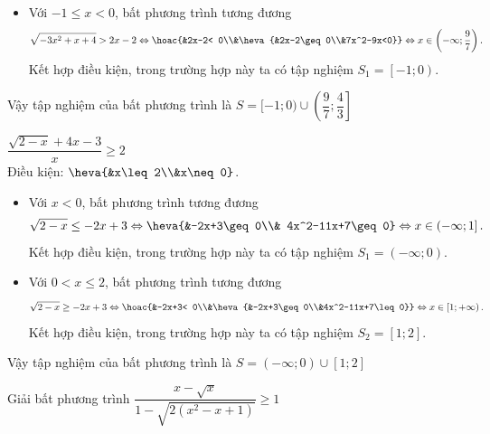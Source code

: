 \begin{bt}
{\begin{listEX}[1]
\begin{itemize}
				\item Với $-1\leq x<0$, bất phương trình tương đương $$\sqrt{-3x^2+x+4}>2x-2\Leftrightarrow \hoac{&2x-2< 0\\&\heva{&2x-2\geq  0\\&7x^2-9x<0}}\Leftrightarrow x\in \left(-\infty;\dfrac{9}{7}\right).$$ 
				Kết hợp điều kiện, trong trường hợp này ta có tập nghiệm $S_1=\left[-1;0\right).$
			\end{itemize}
			Vậy tập nghiệm của bất phương trình là $S=[-1;0)\cup \left(\dfrac{9}{7};\dfrac{4}{3}\right]$
			\item $\dfrac{\sqrt{2-x}+4x-3}x\geq 2$\\
			Điều kiện: $\heva{&x\leq 2\\&x\neq 0}$.
			\begin{itemize}
				\item Với $x<0$, bất phương trình tương đương $$\sqrt{2-x}\leq -2x+3\Leftrightarrow \heva{&-2x+3\geq 0\\& 4x^2-11x+7\geq 0}\Leftrightarrow x\in \left(-\infty;1\right].$$ 
				Kết hợp điều kiện, trong trường hợp này ta có tập nghiệm $S_1=\left(-\infty;0\right).$
				
				\item Với $0<x\leq2$, bất phương trình tương đương $$\sqrt{2-x}\geq -2x+3\Leftrightarrow \hoac{&-2x+3< 0\\&\heva{&-2x+3\geq  0\\&4x^2-11x+7\leq 0}}\Leftrightarrow x\in \left[1;+\infty\right).$$ 
				Kết hợp điều kiện, trong trường hợp này ta có tập nghiệm $S_2=[1;2].$
			\end{itemize}
			Vậy tập nghiệm của bất phương trình là $S=(-\infty;0)\cup [1;2]$
		\end{listEX}	
	}
\end{bt}

\begin{bt}%
	Giải bất phương trình $\dfrac{x-\sqrt x}{1-\sqrt{2\left(x^2-x+1\right)}}\geq 1$
\end{bt}

